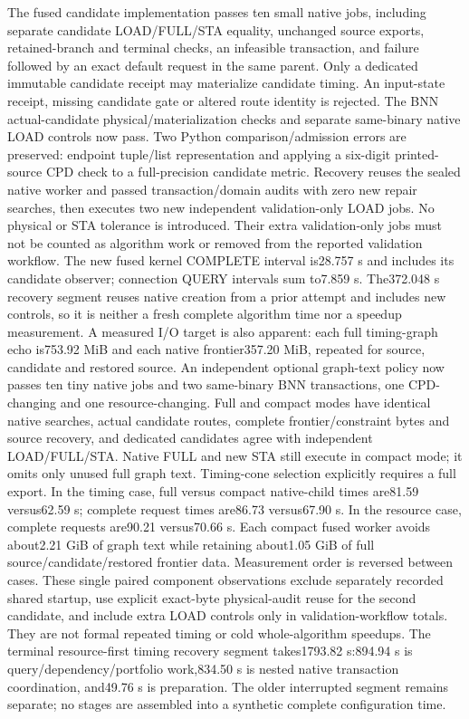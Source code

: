 \documentclass[conference,10pt]{IEEEtran}
\begin{document}
The fused candidate implementation passes ten small native jobs, including separate candidate LOAD/FULL/STA equality, unchanged source exports, retained-branch and terminal checks, an infeasible transaction, and failure followed by an exact default request in the same parent. Only a dedicated immutable candidate receipt may materialize candidate timing. An input-state receipt, missing candidate gate or altered route identity is rejected. The BNN actual-candidate physical/materialization checks and separate same-binary native LOAD controls now pass. Two Python comparison/admission errors are preserved: endpoint tuple/list representation and applying a six-digit printed-source CPD check to a full-precision candidate metric. Recovery reuses the sealed native worker and passed transaction/domain audits with zero new repair searches, then executes two new independent validation-only LOAD jobs. No physical or STA tolerance is introduced. Their extra validation-only jobs must not be counted as algorithm work or removed from the reported validation workflow. The new fused kernel COMPLETE interval is28.757 s and includes its candidate observer; connection QUERY intervals sum to7.859 s. The372.048 s recovery segment reuses native creation from a prior attempt and includes new controls, so it is neither a fresh complete algorithm time nor a speedup measurement. A measured I/O target is also apparent: each full timing-graph echo is753.92 MiB and each native frontier357.20 MiB, repeated for source, candidate and restored source. An independent optional graph-text policy now passes ten tiny native jobs and two same-binary BNN transactions, one CPD-changing and one resource-changing. Full and compact modes have identical native searches, actual candidate routes, complete frontier/constraint bytes and source recovery, and dedicated candidates agree with independent LOAD/FULL/STA. Native FULL and new STA still execute in compact mode; it omits only unused full graph text. Timing-cone selection explicitly requires a full export. In the timing case, full versus compact native-child times are81.59 versus62.59 s; complete request times are86.73 versus67.90 s. In the resource case, complete requests are90.21 versus70.66 s. Each compact fused worker avoids about2.21 GiB of graph text while retaining about1.05 GiB of full source/candidate/restored frontier data. Measurement order is reversed between cases. These single paired component observations exclude separately recorded shared startup, use explicit exact-byte physical-audit reuse for the second candidate, and include extra LOAD controls only in validation-workflow totals. They are not formal repeated timing or cold whole-algorithm speedups. The terminal resource-first timing recovery segment takes1793.82 s:894.94 s is query/dependency/portfolio work,834.50 s is nested native transaction coordination, and49.76 s is preparation. The older interrupted segment remains separate; no stages are assembled into a synthetic complete configuration time.
\end{document}
